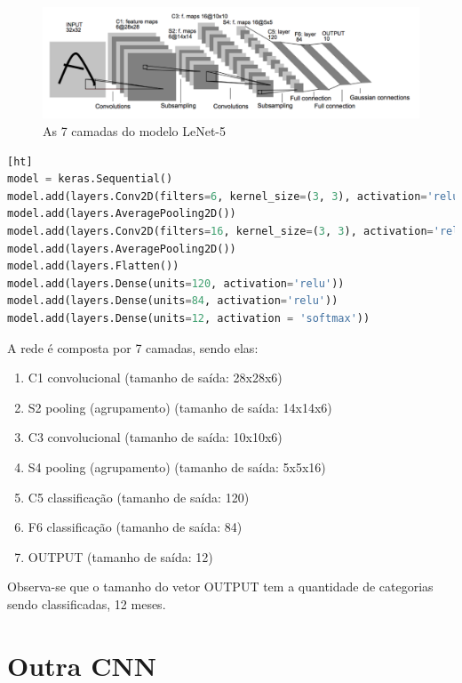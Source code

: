 \documentclass[12pt,
	english,			%
	french,				%
	spanish,			%
	brazil,				%
	]{article}
\begin{document}
\newpage

\begin{figure}[!ht]
  \centering
  \includegraphics[width=35em]{images/lenet5.pdf}
  \caption{As 7 camadas do modelo LeNet-5\cite{Lecun98gradient-basedlearning}}
  \label{fig:image_lenet5}
\end{figure}

\begin{lstlisting}[caption={LeNet-5 implementado em Keras},captionpos=b,frame=single,label={code:modelo_lenet}, language=Python][ht]
model = keras.Sequential()
model.add(layers.Conv2D(filters=6, kernel_size=(3, 3), activation='relu', input_shape=(32,32,1)))
model.add(layers.AveragePooling2D())
model.add(layers.Conv2D(filters=16, kernel_size=(3, 3), activation='relu'))
model.add(layers.AveragePooling2D())
model.add(layers.Flatten())
model.add(layers.Dense(units=120, activation='relu'))
model.add(layers.Dense(units=84, activation='relu'))
model.add(layers.Dense(units=12, activation = 'softmax'))
\end{lstlisting}

A rede é composta por 7 camadas, sendo elas:
\begin{enumerate}
  \item C1 convolucional (tamanho de saída: 28x28x6)
  \item S2 pooling (agrupamento) (tamanho de saída: 14x14x6)
  \item C3 convolucional (tamanho de saída: 10x10x6)
  \item S4 pooling (agrupamento) (tamanho de saída: 5x5x16)
  \item C5 classificação (tamanho de saída: 120)
  \item F6 classificação (tamanho de saída: 84)
  \item OUTPUT (tamanho de saída: 12)
\end{enumerate}

Observa-se que o tamanho do vetor OUTPUT tem a quantidade de categorias sendo classificadas, 12 meses.

\section{Outra CNN}
\end{document}

